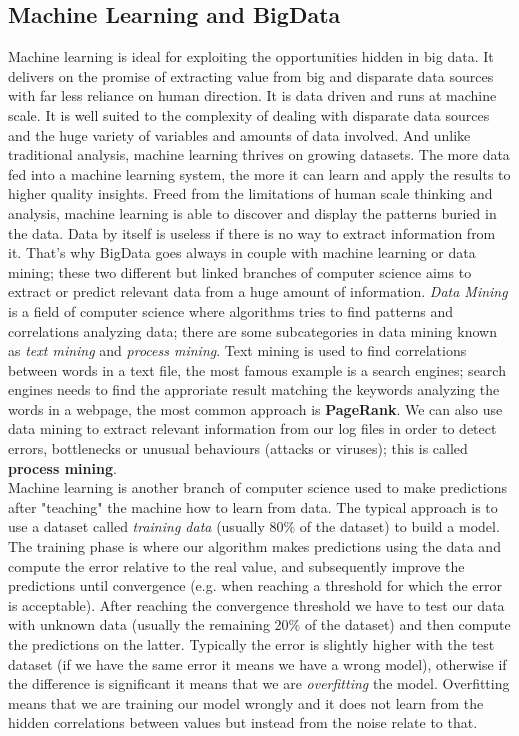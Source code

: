 \documentclass{sig-alternate-05-2015}
\begin{document}
\subsection{Machine Learning and BigData}
Machine learning is ideal for exploiting the opportunities hidden in big data.
It delivers on the promise of extracting value from big and disparate data sources with far less reliance on human
direction. It is data driven and runs at machine scale.
It is well suited to the complexity of dealing with disparate
data sources and the huge variety of variables and amounts of data involved.
And unlike traditional analysis, machine learning thrives on growing datasets.
The more data fed into a machine learning system, the more it can learn and apply
the results to higher quality insights.
Freed from the limitations of human scale thinking and analysis, machine learning is able to discover and display the patterns buried in the data.\cite{skytree}
Data by itself is useless if there is no way to extract information from it.
That's why BigData goes always in couple with machine learning or data mining;
these two different but linked branches of computer science aims to extract or predict
relevant data from a huge amount of information. \textit{Data Mining} is a
field of computer science where algorithms tries to find patterns and correlations
analyzing data; there are some subcategories in data mining known as \textit{text mining}
and \textit{process mining}. Text mining is used to find correlations between words
in a text file, the most famous example is a search engines; search engines needs to
find the approriate result matching the keywords analyzing the words in a webpage, the most
common approach is \textbf{PageRank}. We can also use data mining to extract
relevant information from our log files in order to detect errors, bottlenecks
or unusual behaviours (attacks or viruses); this is called \textbf{process mining}.\\
Machine learning is another branch of computer science used to make predictions
after "teaching" the machine how to learn from data. The typical approach is
to use a dataset called \textit{training data} (usually 80$\%$ of the dataset) to
build a model. The training phase is where our algorithm makes predictions using
the data and compute the error relative to the real value, and subsequently
improve the predictions until convergence (e.g. when reaching a threshold for which
the error is acceptable). After reaching the convergence threshold we have to
test our data with unknown data (usually the remaining 20$\%$ of the dataset)
and then compute the predictions on the latter. Typically
the error is slightly higher with the test dataset (if we have the same error it means we have a wrong model),
otherwise if the difference is significant it means that we are \textit{overfitting} the model. Overfitting means
that we are training our model wrongly and it does not learn from the hidden correlations
between values but instead from the noise relate to that.
\end{document}
